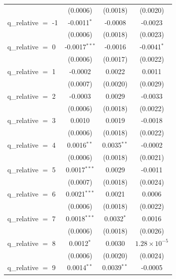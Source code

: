 \begin{tabular}{lccc}
                        & (0.0006)              & (0.0018)      & (0.0020)\\   
   q\_relative $=$ -1   & -0.0011$^{*}$         & -0.0008       & -0.0023\\   
                        & (0.0006)              & (0.0018)      & (0.0023)\\   
   q\_relative $=$ 0    & -0.0017$^{***}$       & -0.0016       & -0.0041$^{*}$\\   
                        & (0.0006)              & (0.0017)      & (0.0022)\\   
   q\_relative $=$ 1    & -0.0002               & 0.0022        & 0.0011\\   
                        & (0.0007)              & (0.0020)      & (0.0029)\\   
   q\_relative $=$ 2    & -0.0003               & 0.0029        & -0.0033\\   
                        & (0.0006)              & (0.0018)      & (0.0022)\\   
   q\_relative $=$ 3    & 0.0010                & 0.0019        & -0.0018\\   
                        & (0.0006)              & (0.0018)      & (0.0022)\\   
   q\_relative $=$ 4    & 0.0016$^{**}$         & 0.0035$^{**}$ & -0.0002\\   
                        & (0.0006)              & (0.0018)      & (0.0021)\\   
   q\_relative $=$ 5    & 0.0017$^{***}$        & 0.0029        & -0.0011\\   
                        & (0.0007)              & (0.0018)      & (0.0024)\\   
   q\_relative $=$ 6    & 0.0021$^{***}$        & 0.0021        & 0.0006\\   
                        & (0.0006)              & (0.0018)      & (0.0022)\\   
   q\_relative $=$ 7    & 0.0018$^{***}$        & 0.0032$^{*}$  & 0.0016\\   
                        & (0.0006)              & (0.0018)      & (0.0026)\\   
   q\_relative $=$ 8    & 0.0012$^{*}$          & 0.0030        & $1.28\times 10^{-5}$\\    
                        & (0.0006)              & (0.0020)      & (0.0024)\\   
   q\_relative $=$ 9    & 0.0014$^{**}$         & 0.0039$^{**}$ & -0.0005\\   

\end{tabular}
